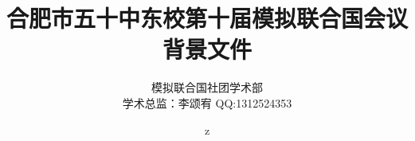 \documentclass{article}
\title{合肥市五十中东校第十届模拟联合国会议\\\huge 背景文件}
\author{模拟联合国社团学术部 \\ 学术总监：李颂宥 QQ:1312524353 \and z}
\begin{document}
    \centering
    \maketitle
    \clearpage
    \tableofcontents
\end{document}
